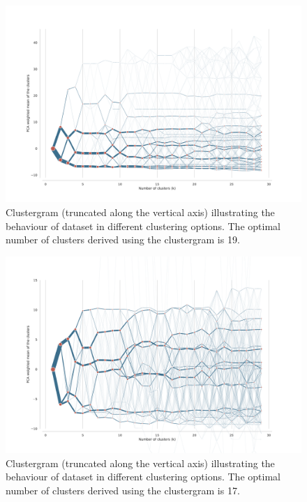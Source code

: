 \begin{figure}
    \includegraphics[width=\linewidth]{figures/clustergram_med.pdf}
    \caption{Clustergram (truncated along the vertical axis) illustrating the behaviour of dataset in different clustering options. The optimal number of clusters derived using the clustergram is 19.}
    \label{fig:cgram_med}
\end{figure}

\begin{figure}
    \includegraphics[width=\linewidth]{figures/clustergram_des.pdf}
    \caption{Clustergram (truncated along the vertical axis) illustrating the behaviour of dataset in different clustering options. The optimal number of clusters derived using the clustergram is 17.}
    \label{fig:cgram_des}
\end{figure}

